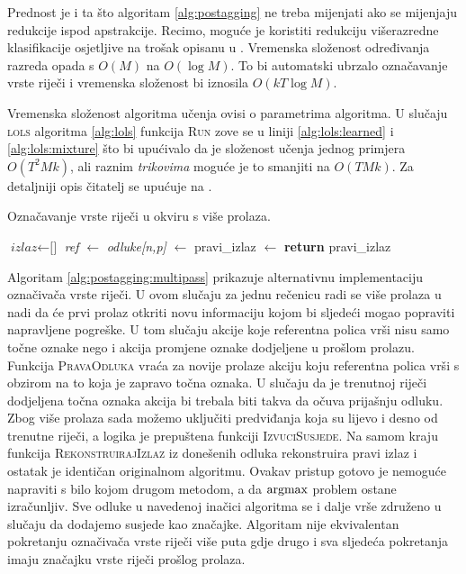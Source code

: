 Prednost je i ta što algoritam \ref{alg:postagging} ne treba mijenjati ako se
mijenjaju redukcije ispod apstrakcije. Recimo, moguće je koristiti redukciju
višerazredne klasifikacije osjetljive na trošak opisanu u
\citep{beygelzimer2009error}. Vremenska složenost određivanja razreda opada s
$O(M)$ na $O(\log M)$. To bi automatski ubrzalo označavanje vrste riječi i
vremenska složenost bi iznosila $O(k T \log M)$.

Vremenska složenost algoritma učenja ovisi o parametrima algoritma. U slučaju
\textsc{lols} algoritma \ref{alg:lols} funkcija \textsc{Run} zove se u liniji
\ref{alg:lols:learned} i \ref{alg:lols:mixture} što bi upućivalo da je složenost
učenja jednog primjera $O(T ^ 2 M k)$, ali raznim \textit{trikovima} moguće je
to smanjiti na $O(T M k)$. Za detaljniji opis čitatelj se upućuje na
\citep{daume14lts}.

\begin{algorithm}
\caption{Označavanje vrste riječi u \lts{} okviru s više prolaza.}\label{alg:postagging:multipass}
\begin{algorithmic}[1]
\State $\textit{izlaz} \gets \text{[]}$
    \State \textit{ref} $\gets$ 
    \State \textit{odluke[n,p]} $\gets$ 
  \EndFor
\EndFor
\State pravi\_izlaz $\gets$ 
\State {}
\State \textbf{return} pravi\_izlaz
\EndFunction
\end{algorithmic}
\end{algorithm}

Algoritam \ref{alg:postagging:multipass} prikazuje alternativnu implementaciju
označivača vrste riječi. U ovom slučaju za jednu rečenicu radi se više prolaza u
nadi da će prvi prolaz otkriti novu informaciju kojom bi sljedeći mogao
popraviti napravljene pogreške. U tom slučaju akcije koje referentna polica vrši
nisu samo točne oznake nego i akcija promjene oznake dodjeljene u prošlom
prolazu. Funkcija \textsc{PravaOdluka} vraća za novije prolaze akciju koju
referentna polica vrši s obzirom na to koja je zapravo točna oznaka. U slučaju
da je trenutnoj riječi dodjeljena točna oznaka akcija bi trebala biti takva da
očuva prijašnju odluku. Zbog više prolaza sada možemo uključiti predviđanja koja
su lijevo i desno od trenutne riječi, a logika je prepuštena funkciji
\textsc{IzvuciSusjede}. Na samom kraju funkcija \textsc{RekonstruirajIzlaz} iz
donešenih odluka rekonstruira pravi izlaz i ostatak je identičan originalnom
algoritmu. Ovakav pristup gotovo je nemoguće napraviti s bilo kojom drugom
metodom, a da $\operatorname*{argmax}$ problem ostane izračunljiv. Sve odluke u navedenoj
inačici algoritma se i dalje vrše združeno u slučaju da dodajemo susjede kao
značajke. Algoritam nije ekvivalentan pokretanju označivača vrste riječi više
puta gdje drugo i sva sljedeća pokretanja imaju značajku vrste riječi prošlog
prolaza.
